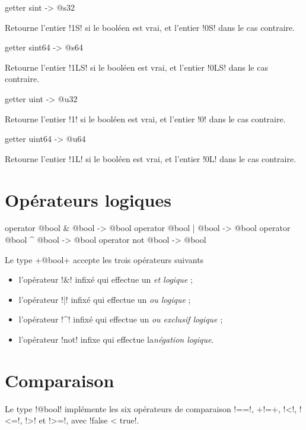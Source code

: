 
\begin{galgas4box}
getter sint -> @s32
\end{galgas4box}

Retourne l'entier \ggsq!1S! si le booléen est vrai, et l'entier \ggsq!0S! dans le cas contraire.





\begin{galgas4box}
getter sint64 -> @s64
\end{galgas4box}

Retourne l'entier \ggsq!1LS! si le booléen est vrai, et l'entier \ggsq!0LS! dans le cas contraire.





\begin{galgas4box}
getter uint -> @u32
\end{galgas4box}

Retourne l'entier \ggsq!1! si le booléen est vrai, et l'entier \ggsq!0! dans le cas contraire.





\begin{galgas4box}
getter uint64 -> @u64
\end{galgas4box}

Retourne l'entier \ggsq!1L! si le booléen est vrai, et l'entier \ggsq!0L! dans le cas contraire.




\section{Opérateurs logiques}

\begin{galgas4box}
operator @bool & @bool -> @bool
operator @bool | @bool -> @bool
operator @bool ^ @bool -> @bool
operator not @bool -> @bool
\end{galgas4box}

Le type \ggsq+@bool+ accepte les trois opérateurs suivants
\begin{itemize}
\item l'opérateur \ggsq!&! infixé qui effectue un \emph{et logique} ;
\item l'opérateur \ggsq!|! infixé qui effectue un \emph{ou logique} ;
\item l'opérateur \ggsq!^! infixé qui effectue un \emph{ou exclusif logique} ;
\item l'opérateur \ggsq!not! infixe qui effectue la\emph{négation logique}.
\end{itemize}








\section{Comparaison}

Le type \ggsq!@bool! implémente les six opérateurs de comparaison \ggsq!==!, \ggsq+!=+, \ggsq!<!, \ggsq!<=!, \ggsq!>! et \ggsq!>=!, avec \ggsq!false < true!.

